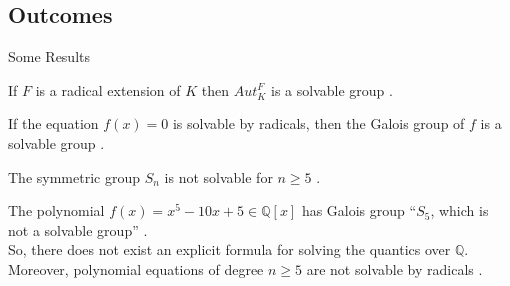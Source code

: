 \documentclass{beamer}
\begin{document}
\subsection{Outcomes}
\begin{frame}{Some Results}

  \begin{theorem}[Theorem]
If \(F\) is a radical extension of \(K\) then \(Aut_K^F\) is a solvable group \cite{hunger}.
\end{theorem}

\begin{corollary}[Corollary]
If the equation \(f(x)=0\) is solvable by radicals, then the Galois group of \(f\) is a \textcolor{green!50!black}{solvable group} \cite{hunger}.
\end{corollary}

\begin{theorem}[Theorem]
The symmetric group \(S_n\) is not solvable for \(n \geq 5\) \cite{hunger}.
\end{theorem}

  \begin{tcolorbox}[colback=white, colframe=red, boxsep=1mm, title={\bfseries \color{white} Outcomes}]
  The polynomial \(f(x)=x^5-10x+5 \in \mathbb{Q}[x]\) has Galois group ``\(S_5\), which is not a solvable group'' \cite{hunger}. \\[1mm]
So, there does not exist an explicit formula for solving the quantics over \(\mathbb{Q}\). Moreover, \textcolor{green!50!black}{polynomial equations of degree \(n \geq 5\) are not solvable by radicals} \cite{hunger}.
\end{tcolorbox}

\end{frame}
\end{document}
